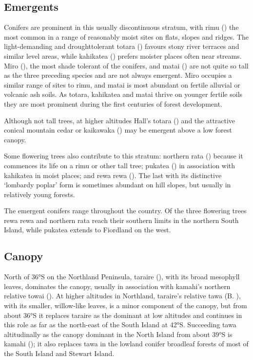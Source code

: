 \subsection{Emergents}

Conifers are prominent in this usually discontinuous stratum, with rimu () the most common in a range of reasonably moist sites on flats, slopes and ridges.
The light-demanding and droughttolerant totara () favours stony river terraces and similar level areas, while kahikatea () prefers moister places often near streams.
Miro (), the most shade tolerant of the conifers, and matai () are not quite so tall as the three preceding species and are not always emergent.
Miro occupies a similar range of sites to rimu, and matai is most abundant on fertile alluvial or volcanic ash soils.
As totara, kahikatea and matai thrive on younger fertile soils they are most prominent during the first centuries of forest development.

Although not tall trees, at higher altitudes Hall's totara () and the attractive conical mountain cedar or kaikawaka () may be emergent above a low forest canopy.

Some flowering trees also contribute to this stratum: northern rata () because it commences its life on a rimu or other tall tree; pukatea () in association with kahikatea in moist places; and rewa rewa ().
The last with its distinctive `lombardy poplar' form is sometimes abundant on hill slopes, but usually in relatively young forests.

The emergent conifers range throughout the country.
Of the three flowering trees rewa rewa and northern rata reach their southern limits in the northern South Island, while pukatea extends to Fiordland on the west.

\subsection{Canopy}

North of 36°S on the Northland Peninsula, taraire (), with its broad mesophyll leaves, dominates the canopy, usually in association with kamahi's northern relative towai ().
At higher altitudes in Northland, taraire's relative tawa (B. ), with its smaller, willow-like leaves, is a minor component of the canopy, but from about 36°S it replaces taraire as the dominant at low altitudes and continues in this role as far as the north-east of the South Island at 42°S.
Succeeding tawa altitudinally as the canopy dominant in the North Island from about 39°S is kamahi (); it also replaces tawa in the lowland conifer broadleaf forests of most of the South Island and Stewart Island.

